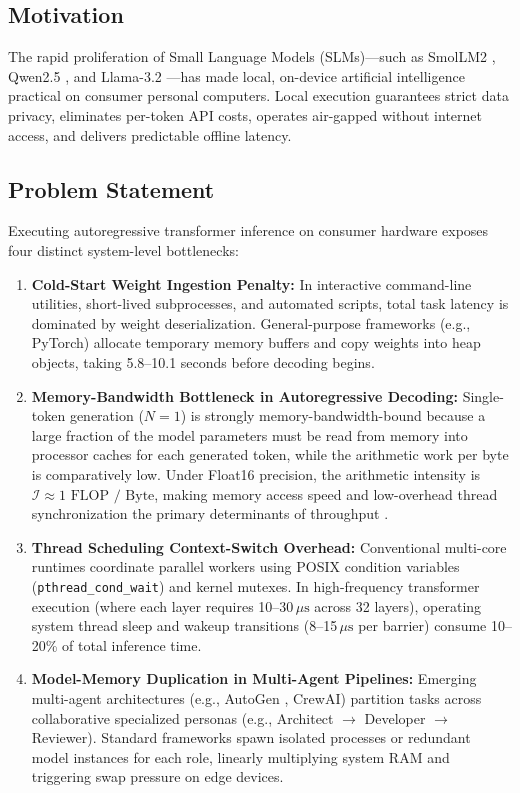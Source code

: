 \documentclass[10pt,twocolumn]{article}
\begin{document}
\subsection{Motivation}
The rapid proliferation of Small Language Models (SLMs)---such as SmolLM2 \cite{smollm2}, Qwen2.5 \cite{qwen25}, and Llama-3.2 \cite{llama3}---has made local, on-device artificial intelligence practical on consumer personal computers. Local execution guarantees strict data privacy, eliminates per-token API costs, operates air-gapped without internet access, and delivers predictable offline latency.

\subsection{Problem Statement}
Executing autoregressive transformer inference on consumer hardware exposes four distinct system-level bottlenecks:

\begin{enumerate}
    \item \textbf{Cold-Start Weight Ingestion Penalty:} In interactive command-line utilities, short-lived subprocesses, and automated scripts, total task latency is dominated by weight deserialization. General-purpose frameworks (e.g., PyTorch) allocate temporary memory buffers and copy weights into heap objects, taking 5.8--10.1 seconds before decoding begins.
    \item \textbf{Memory-Bandwidth Bottleneck in Autoregressive Decoding:} Single-token generation ($N = 1$) is strongly memory-bandwidth-bound because a large fraction of the model parameters must be read from memory into processor caches for each generated token, while the arithmetic work per byte is comparatively low. Under Float16 precision, the arithmetic intensity is $\mathcal{I} \approx 1 \text{ FLOP / Byte}$, making memory access speed and low-overhead thread synchronization the primary determinants of throughput \cite{roofline}.
    \item \textbf{Thread Scheduling Context-Switch Overhead:} Conventional multi-core runtimes coordinate parallel workers using POSIX condition variables (\texttt{pthread\_cond\_wait}) and kernel mutexes. In high-frequency transformer execution (where each layer requires 10--30\,$\mu\text{s}$ across 32 layers), operating system thread sleep and wakeup transitions (8--15\,$\mu\text{s}$ per barrier) consume 10--20\% of total inference time.
    \item \textbf{Model-Memory Duplication in Multi-Agent Pipelines:} Emerging multi-agent architectures (e.g., AutoGen \cite{autogen}, CrewAI) partition tasks across collaborative specialized personas (e.g., Architect $\to$ Developer $\to$ Reviewer). Standard frameworks spawn isolated processes or redundant model instances for each role, linearly multiplying system RAM and triggering swap pressure on edge devices.
\end{enumerate}
\end{document}
